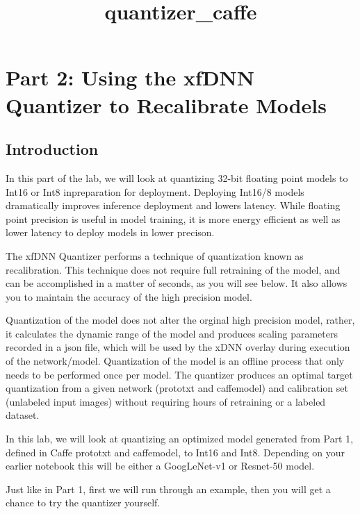 \documentclass[11pt]{article}
\title{quantizer\_caffe}
\begin{document}
    
    
    \maketitle
    
    

    
    \section{Part 2: Using the xfDNN Quantizer to Recalibrate
Models}\label{part-2-using-the-xfdnn-quantizer-to-recalibrate-models}

\subsection{Introduction}\label{introduction}

In this part of the lab, we will look at quantizing 32-bit floating
point models to Int16 or Int8 inpreparation for deployment. Deploying
Int16/8 models dramatically improves inference deployment and lowers
latency. While floating point precision is useful in model training, it
is more energy efficient as well as lower latency to deploy models in
lower precison.

The xfDNN Quantizer performs a technique of quantization known as
recalibration. This technique does not require full retraining of the
model, and can be accomplished in a matter of seconds, as you will see
below. It also allows you to maintain the accuracy of the high precision
model.

Quantization of the model does not alter the orginal high precision
model, rather, it calculates the dynamic range of the model and produces
scaling parameters recorded in a json file, which will be used by the
xDNN overlay during execution of the network/model. Quantization of the
model is an offline process that only needs to be performed once per
model. The quantizer produces an optimal target quantization from a
given network (prototxt and caffemodel) and calibration set (unlabeled
input images) without requiring hours of retraining or a labeled
dataset.

In this lab, we will look at quantizing an optimized model generated
from Part 1, defined in Caffe prototxt and caffemodel, to Int16 and
Int8. Depending on your earlier notebook this will be either a
GoogLeNet-v1 or Resnet-50 model.

Just like in Part 1, first we will run through an example, then you will
get a chance to try the quantizer yourself.
\end{document}
